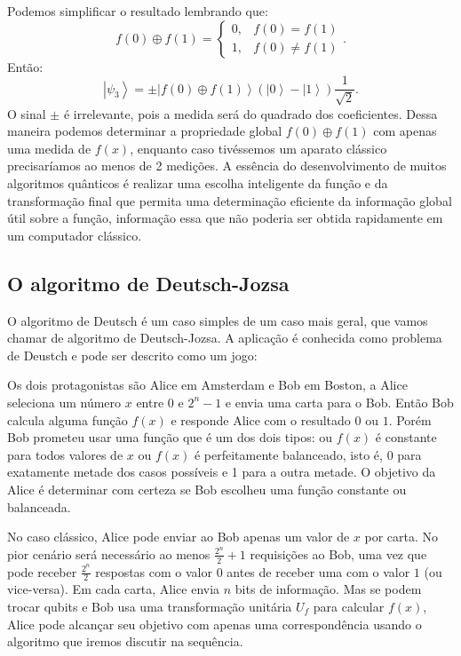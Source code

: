 Podemos simplificar o resultado lembrando que:
\begin{equation}
f\left(0\right)\oplus f\left(1\right)=\left\{ \begin{array}{cc}
0, & f\left(0\right)=f\left(1\right)\\
1, & f\left(0\right)\neq f\left(1\right)
\end{array}\right.
. \end{equation}
Então:
\begin{equation}
\left|\psi_{3}\right\rangle =\pm\left|f\left(0\right)\oplus f\left(1\right)\right\rangle \left(\left|0\right\rangle -\left|1\right\rangle \right)\frac{1}{\sqrt{2}}
. \end{equation}
O sinal $\pm$ é irrelevante, pois a medida será do quadrado dos coeficientes. Dessa maneira podemos determinar a propriedade global $f\left(0\right)\oplus f\left(1\right)$ com apenas uma medida de $f\left(x\right)$, enquanto caso tivéssemos um aparato clássico precisaríamos ao menos de 2 medições. A essência do desenvolvimento de muitos algoritmos quânticos é realizar uma escolha inteligente da função e da transformação final que permita uma determinação eficiente da informação global útil sobre a função, informação essa que não poderia ser obtida rapidamente em um computador clássico.

\subsection{O algoritmo de Deutsch-Jozsa}
O algoritmo de Deutsch é um caso simples de um caso mais geral, que vamos chamar de algoritmo de Deutsch-Jozsa. A aplicação é conhecida como problema de Deustch e pode ser descrito como um jogo:

Os dois protagonistas são Alice em Amsterdam e Bob em Boston, a Alice seleciona um número $x$ entre $0$ e $2^{n}-1$ e envia uma carta para o Bob. Então Bob calcula alguma função $f\left(x\right)$  e responde Alice com o resultado $0$ ou $1$. Porém Bob prometeu usar uma função que é um dos dois tipos:  ou $f\left(x\right)$  é constante para todos valores de $x$ ou  $f\left(x\right)$  é perfeitamente balanceado, isto é, 0 para exatamente metade dos casos possíveis e 1 para a outra metade. O objetivo da Alice é determinar com certeza se Bob escolheu uma função constante ou balanceada.

No caso clássico, Alice pode enviar ao Bob apenas um valor de $x$  por carta. No pior cenário será necessário ao menos $\frac{2^{n}}{2}+1$ requisições ao Bob, uma vez que pode receber $\frac{2^{n}}{2}$ respostas com o valor $0$ antes de receber uma com o valor $1$ (ou vice-versa). Em cada carta, Alice envia $n$ bits de informação. Mas se podem trocar qubits e Bob usa uma transformação unitária $U_f$ para calcular $f\left(x\right)$, Alice pode alcançar seu objetivo com apenas uma correspondência usando o algoritmo que iremos discutir na sequência.

